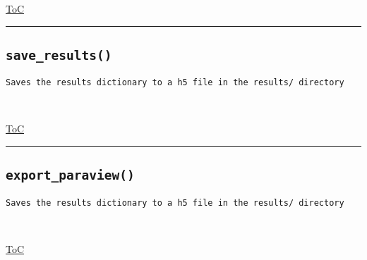 \documentclass{article}
\begin{document}
\begin{flushright}

\hyperref[toc]{ToC}

\end{flushright}



\vspace{5mm}

\hrule

\subsection*{\texttt{save\_results()}}
\label{fun:saveresults}

\begin{lstlisting}[language=docstring]
Saves the results dictionary to a h5 file in the results/ directory

    
\end{lstlisting}

\begin{flushright}

\hyperref[toc]{ToC}

\end{flushright}



\vspace{5mm}

\hrule

\subsection*{\texttt{export\_paraview()}}
\label{fun:exportparaview}

\begin{lstlisting}[language=docstring]
Saves the results dictionary to a h5 file in the results/ directory

    
\end{lstlisting}

\begin{flushright}

\hyperref[toc]{ToC}

\end{flushright}



\vspace{5mm}
\end{document}
